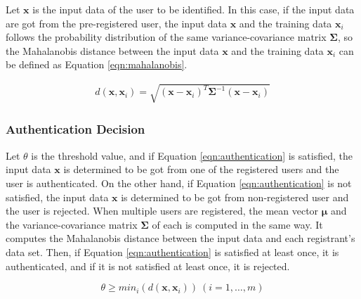 \documentclass[sigchi,authordraft]{acmart}
\begin{document}
Let $\bm{x}$ is the input data of the user to be identified. In this case, if the input data are got from the pre-registered user, the input data $\bm{x}$ and the training data $\bm{x}_i$ follows the probability distribution of the same variance-covariance matrix $\bm{\Sigma}$, so the Mahalanobis distance between the input data $\bm{x}$ and the training data $\bm{x}_i$ can be defined as Equation \ref{eqn:mahalanobis}.

\begin{eqnarray}
\label{eqn:mahalanobis}
  d(\bm{x},\bm{x}_i) = \sqrt{(\bm{x}-\bm{x}_i)^{T}\bm{\Sigma}^{-1}(\bm{x}-\bm{x}_i)}
\end{eqnarray}


\subsubsection{Authentication Decision}
Let $\theta$ is the threshold value, and if Equation \ref{eqn:authentication} is satisfied, the input data $\bm{x}$ is determined to be got from one of the registered users and the user is authenticated. On the other hand, if Equation \ref{eqn:authentication} is not satisfied, the input data $\bm{x}$ is determined to be got from non-registered user and the user is rejected. When multiple users are registered, the mean vector $\bm{\mu}$ and the variance-covariance matrix $\bm{\Sigma}$ of each is computed in the same way. It computes the Mahalanobis distance between the input data and each registrant's data set. Then, if Equation \ref{eqn:authentication} is satisfied at least once, it is authenticated, and if it is not satisfied at least once, it is rejected.

\begin{equation}
\label{eqn:authentication}
  \theta \geq min_i(d(\bm{x},\bm{x}_i))~(i=1,\dots,m)
\end{equation}

\end{document}
